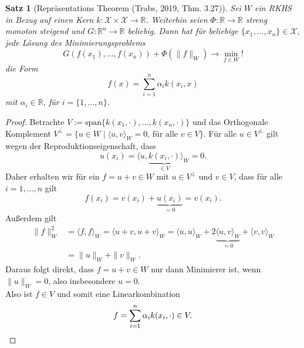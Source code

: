 \documentclass{article}
\theoremstyle{plain}
\newtheorem{thm}{Satz}[subsection]
\theoremstyle{definition}
\begin{document}
    \begin{thm}[Repräsentations Theorem (Trabs, 2019, \cite{trabs} Thm. 3.27)] \label{representer}
        Sei $W$ ein RKHS in Bezug auf einen Kern $k:\mathcal{X} \times \mathcal{X} \to \mathbb{R}$. Weiterhin seien $\Phi: \mathbb{R} \to \mathbb{R}$ streng monoton steigend und $G: \mathbb{R}^n \to \mathbb{R}$ beliebig. Dann hat für beliebige $\{x_1, ..., x_n\} \in \mathcal{X}$, jede Lösung des Minimierungsproblems
        \begin{equation}
            G(f(x_1), ..., f(x_n)) + \Phi(\|f\|_{W}) \to \min_{f\in W}!
        \end{equation}
        die Form
        \begin{equation*}
            f(x) = \sum_{i=1}^{n} \alpha_i k(x_i, x)
        \end{equation*}
        mit $\alpha_i \in \mathbb{R}$, für $i = \{1,...,n\}$. \\
    \end{thm}
    \begin{proof}
        Betrachte $V := \text{span}\{k(x_1,\cdot),...,k(x_n,\cdot)\}$ und das Orthogonale Komplement $V^\bot = \{u \in W \mid \langle u, v \rangle_W = 0 \text{, für alle } v \in V\}$. Für alle $u \in V^\bot$ gilt wegen der Reproduktionseigenschaft, dass
        \begin{equation*}
            u(x_i) = \langle u, \underbrace{k(x_i, \cdot)}_{\in V} \rangle_W = 0.
        \end{equation*}
        Daher erhalten wir für ein $f = u + v \in W$ mit $u \in V^\bot$ und $v \in V$, dass für alle $i = 1, ..., n$ gilt
        \begin{equation*}
            f(x_i) = v(x_i) + \underbrace{u(x_i)}_{=0} = v(x_i).
        \end{equation*}
        Außerdem gilt
        \begin{equation*}
        \begin{split}
            \| f \|_{W}^2  
                & = \langle f, f \rangle_W 
                    = \langle u + v, u + v \rangle_W 
                    = \langle u, u \rangle_W + 2 \underbrace{\langle u, v    \rangle_W}_{=0} + \langle v, v \rangle_W \\
                & = \| u \|_W + \| v \|_W.
        \end{split}
        \end{equation*}
        Daraus folgt direkt, dass $f = u + v \in W$ nur dann Minimierer ist, wenn $\| u \|_W = 0$, also insbesondere $u = 0$. \\
        Also ist $f \in V$ und somit eine Linearkombination
        \begin{equation*}
            f = \sum_{i = 1}^{n} \alpha_i k(x_i, \cdot) \in V. \qedhere
        \end{equation*}
    \end{proof}
    
\end{document}

